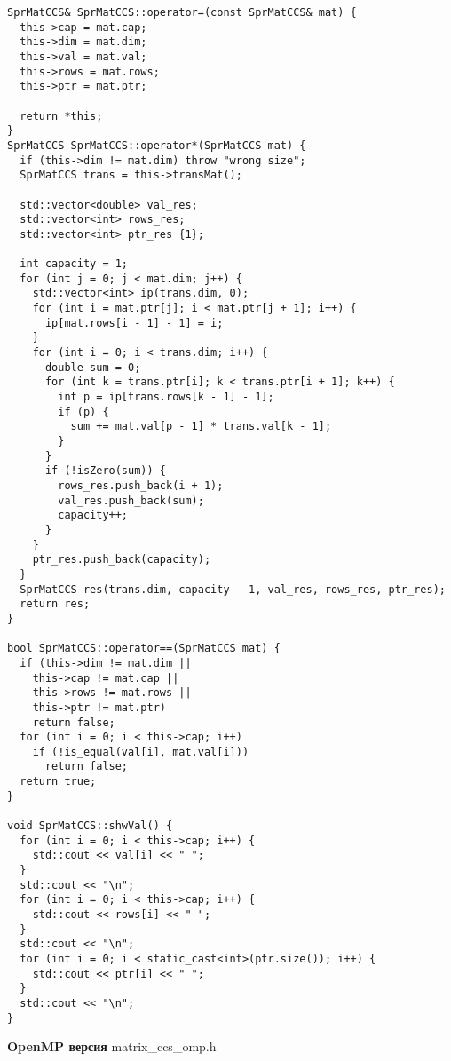 \documentclass{report}
\begin{document}
\begin{lstlisting}
SprMatCCS& SprMatCCS::operator=(const SprMatCCS& mat) {
  this->cap = mat.cap;
  this->dim = mat.dim;
  this->val = mat.val;
  this->rows = mat.rows;
  this->ptr = mat.ptr;

  return *this;
}
SprMatCCS SprMatCCS::operator*(SprMatCCS mat) {
  if (this->dim != mat.dim) throw "wrong size";
  SprMatCCS trans = this->transMat();

  std::vector<double> val_res;
  std::vector<int> rows_res;
  std::vector<int> ptr_res {1};

  int capacity = 1;
  for (int j = 0; j < mat.dim; j++) {
    std::vector<int> ip(trans.dim, 0);
    for (int i = mat.ptr[j]; i < mat.ptr[j + 1]; i++) {
      ip[mat.rows[i - 1] - 1] = i;
    }
    for (int i = 0; i < trans.dim; i++) {
      double sum = 0;
      for (int k = trans.ptr[i]; k < trans.ptr[i + 1]; k++) {
        int p = ip[trans.rows[k - 1] - 1];
        if (p) {
          sum += mat.val[p - 1] * trans.val[k - 1];
        }
      }
      if (!isZero(sum)) {
        rows_res.push_back(i + 1);
        val_res.push_back(sum);
        capacity++;
      }
    }
    ptr_res.push_back(capacity);
  }
  SprMatCCS res(trans.dim, capacity - 1, val_res, rows_res, ptr_res);
  return res;
}

bool SprMatCCS::operator==(SprMatCCS mat) {
  if (this->dim != mat.dim ||
    this->cap != mat.cap ||
    this->rows != mat.rows ||
    this->ptr != mat.ptr)
    return false;
  for (int i = 0; i < this->cap; i++)
    if (!is_equal(val[i], mat.val[i]))
      return false;
  return true;
}

void SprMatCCS::shwVal() {
  for (int i = 0; i < this->cap; i++) {
    std::cout << val[i] << " ";
  }
  std::cout << "\n";
  for (int i = 0; i < this->cap; i++) {
    std::cout << rows[i] << " ";
  }
  std::cout << "\n";
  for (int i = 0; i < static_cast<int>(ptr.size()); i++) {
    std::cout << ptr[i] << " ";
  }
  std::cout << "\n";
}
\end{lstlisting}

\newpage
\textbf{OpenMP версия}
\newline
\newline matrix\_ccs\_omp.h
\end{document}
